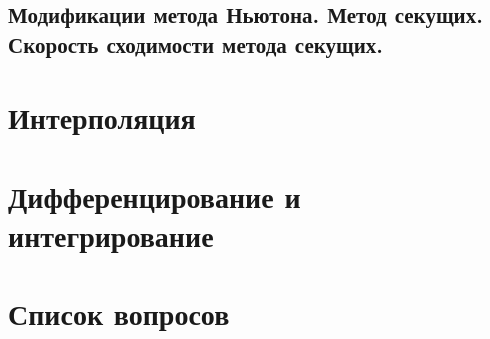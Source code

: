 \documentclass[14pt]{extarticle}
\begin{document}
\clearpage
\subsection{Модификации метода Ньютона. Метод секущих. Скорость сходимости метода секущих.}


\section{Интерполяция}


\section{Дифференцирование и интегрирование}

\section{Список вопросов}
\end{document}
